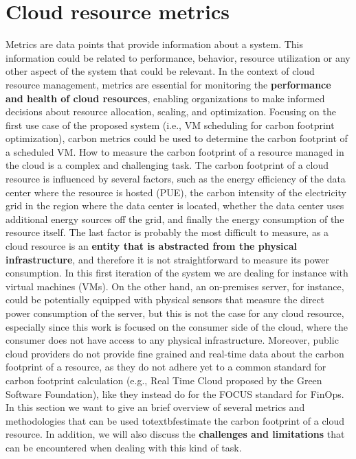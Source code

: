 \newpage

\section{Cloud resource metrics}


Metrics are data points that provide information about a system.
This information could be related to performance, behavior, resource utilization or any other aspect of the system that could be relevant.
In the context of cloud resource management, metrics are essential for monitoring the \textbf{performance and health of cloud resources}, enabling organizations to make informed decisions about resource allocation, scaling, and optimization.
Focusing on the first use case of the proposed system (i.e., VM scheduling for carbon footprint optimization), carbon metrics could be used to determine the carbon footprint of a scheduled VM.
How to measure the carbon footprint of a resource managed in the cloud is a complex and challenging task.
The carbon footprint of a cloud resource is influenced by several factors, such as the energy efficiency of the data center where the resource is hosted (PUE), the carbon intensity of the electricity grid in the region where the data center is located, whether the data center uses additional energy sources off the grid, and finally the energy consumption of the resource itself.
The last factor is probably the most difficult to measure, as a cloud resource is an \textbf{entity that is abstracted from the physical infrastructure}, and therefore it is not straightforward to measure its power consumption. 
In this first iteration of the system we are dealing for instance with virtual machines (VMs).
On the other hand, an on-premises server, for instance, could be potentially equipped with physical sensors that measure the direct power consumption of the server, but this is not the case for any cloud resource, especially since this work is focused on the consumer side of the cloud, where the consumer does not have access to any physical infrastructure.
Moreover, public cloud providers do not provide fine grained and real-time data about the carbon footprint of a resource, as they do not adhere yet to a common standard for carbon footprint calculation (e.g., Real Time Cloud proposed by the Green Software Foundation), like they instead do for the FOCUS standard for FinOps.
In this section we want to give an brief overview of several metrics and methodologies that can be used totextbf{estimate the carbon footprint of a cloud resource}.
In addition, we will also discuss the \textbf{challenges and limitations} that can be encountered when dealing with this kind of task.

